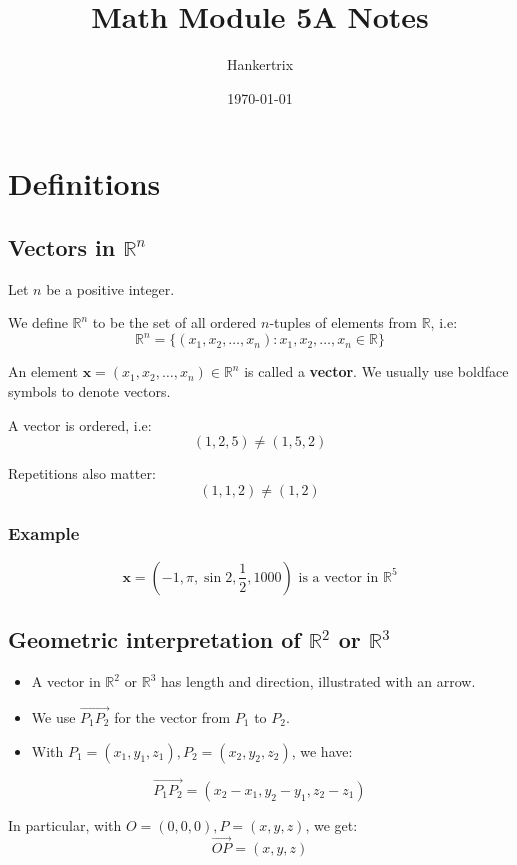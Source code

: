 \documentclass[11pt]{article}
\author{Hankertrix}
\date{\today}
\title{Math Module 5A Notes}
\begin{document}
\maketitle
\setcounter{tocdepth}{2}
\tableofcontents \clearpage\section{Definitions}
\label{sec:orgc9a1f46}

\subsection{Vectors in \(\mathbb{R}^n\)}
\label{sec:org3c2a67e}
Let \(n\) be a positive integer.


We define \(\mathbb{R}^n\) to be the set of all ordered \(n\)-tuples of elements from \(\mathbb{R}\), i.e:
\[\mathbb{R}^n = \{(x_1, x_2, \ldots, x_n): x_1, x_2, \ldots, x_n \in \mathbb{R}\}\]

An element \(\boldsymbol{x} = (x_1, x_2, \ldots, x_n) \in \mathbb{R}^n\) is called a \textbf{vector}. We usually use boldface symbols to denote vectors.


A vector is ordered, i.e:
\[(1, 2, 5) \ne (1, 5, 2)\]

Repetitions also matter:
\[(1, 1, 2) \ne (1, 2)\]
\subsubsection{Example}
\label{sec:org6e8f0ed}
\[\boldsymbol{x} = (-1, \pi, \sin 2, \frac{1}{2}, 1000) \text{ is a vector in } \mathbb{R}^5\]
\subsection{Geometric interpretation of \(\mathbb{R}^2\) or \(\mathbb{R}^3\)}
\label{sec:org75e6633}
\begin{itemize}
\item A vector in \(\mathbb{R}^2 \text{ or } \mathbb{R}^3\) has length and direction, illustrated with an arrow.
\item We use \(\overrightarrow{P_1 P_2}\) for the vector from \(P_1\) to \(P_2\).
\item With \(P_1 = (x_1, y_1, z_1), P_2 = (x_2, y_2, z_2)\), we have:
\end{itemize}
\[\overrightarrow{P_1 P_2} = (x_2 - x_1, y_2 - y_1, z_2 - z_1)\]

In particular, with \(O = (0, 0, 0), P = (x, y, z)\), we get:
\[\overrightarrow{OP} = (x, y, z)\]
\end{document}
